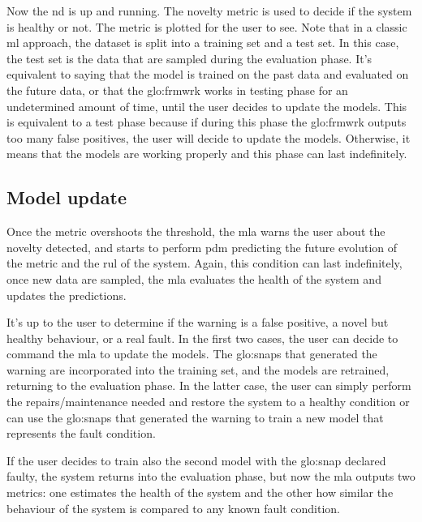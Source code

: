 Now the \gls{nd} is up and running. The novelty metric is used to decide if the system is healthy or not. The metric is plotted for the user to see.
Note that in a classic \gls{ml} approach, the dataset is split into a training set and a test set. In this case, the test set is the data that are sampled during the evaluation phase. It's equivalent to saying that the model is trained on the past data and evaluated on the future data, or that the \gls{glo:frmwrk} works in testing phase for an undetermined amount of time, until the user decides to update the models. This is equivalent to a test phase because if during this phase the \gls{glo:frmwrk} outputs too many false positives, the user will decide to update the models. Otherwise, it means that the models are working properly and this phase can last indefinitely.

\subsection{Model update}
Once the metric overshoots the threshold, the \gls{mla} warns the user about the novelty detected, and starts to perform \gls{pdm} predicting the future evolution of the metric and the \gls{rul} of the system. 
Again, this condition can last indefinitely, once new data are sampled, the \gls{mla} evaluates the health of the system and updates the predictions.

It's up to the user to determine if the warning is a false positive, a novel but healthy behaviour, or a real fault. In the first two cases, the user can decide to command the \gls{mla} to update the models. The \gls{glo:snap}s that generated the warning are incorporated into the training set, and the models are retrained, returning to the evaluation phase. In the latter case, the user can simply perform the repairs/maintenance needed and restore the system to a healthy condition or can use the \gls{glo:snap}s that generated the warning to train a new model that represents the fault condition.

If the user decides to train also the second model with the \gls{glo:snap} declared faulty, the system returns into the evaluation phase, but now the \gls{mla} outputs two metrics: one estimates the health of the system and the other how similar the behaviour of the system is compared to any known fault condition.

